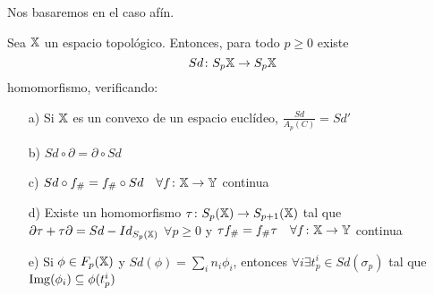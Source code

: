 
Nos basaremos en el caso afín.

\begin{proposition}
  Sea ${\mathbb X}$ un espacio topológico. Entonces, para todo $p \geq 0$ existe
  \[Sd\colon S_p{{\mathbb X}} \to S_p{{\mathbb X}} \] homomorfismo, verificando:
  \begin{itemize}
    \item[a)] Si ${\mathbb X}$ es un convexo de un espacio euclídeo, $\frac{Sd}{A_p(C)} = Sd'$
    \item[b)] $Sd \circ \partial = \partial \circ Sd$
    \item[c)] $Sd \circ f_\# = f_\# \circ Sd \quad \forall f \colon {\mathbb X} \to {\mathbb Y}$ continua
    \item[d)] Existe un homomorfismo $\tau \colon S_{p}({\mathbb X}) \to S_{p+1}({\mathbb X})$ tal que ${\partial \tau + \tau \partial = Sd - Id_{S_p({\mathbb X})}}$
              $\forall p \geq 0$ y $\tau f_\# = f_\# \tau \quad \forall f \colon {\mathbb X} \to {\mathbb Y}$ continua
    \item[e)] Si $\phi \in F_p({\mathbb X})$ y $Sd(\phi) = \sum_i n_i \phi_i$, entonces $\forall i \exists t_p^i \in Sd(\sigma_p)$ tal que
              $\operatorname{Img}(\phi_i) \subseteq \phi(t_p^i)$

  \end{itemize}
\end{proposition}

